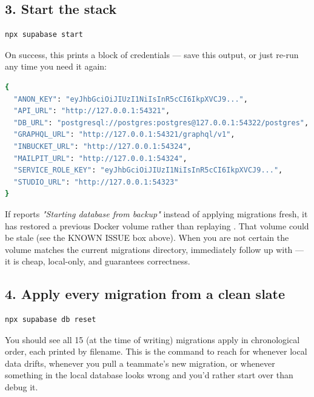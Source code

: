 \subsection{3. Start the stack}

\begin{lstlisting}[style=olkcodebash, language=bash, caption={Pulls Supabase's Docker images (first run only) and starts every service}]
npx supabase start
\end{lstlisting}

On success, this prints a block of credentials — save this output, or just re-run  any time you need it again:

\begin{lstlisting}[style=olkcodebash, language=bash, caption={Typical `supabase start` / `supabase status` output}]
{
  "ANON_KEY": "eyJhbGciOiJIUzI1NiIsInR5cCI6IkpXVCJ9...",
  "API_URL": "http://127.0.0.1:54321",
  "DB_URL": "postgresql://postgres:postgres@127.0.0.1:54322/postgres",
  "GRAPHQL_URL": "http://127.0.0.1:54321/graphql/v1",
  "INBUCKET_URL": "http://127.0.0.1:54324",
  "MAILPIT_URL": "http://127.0.0.1:54324",
  "SERVICE_ROLE_KEY": "eyJhbGciOiJIUzI1NiIsInR5cCI6IkpXVCJ9...",
  "STUDIO_URL": "http://127.0.0.1:54323"
}
\end{lstlisting}

\begin{olktip}
If  reports \emph{"Starting database from backup"} instead of applying migrations fresh, it has restored a previous Docker volume rather than replaying . That volume could be stale (see the KNOWN ISSUE box above). When you are not certain the volume matches the current migrations directory, immediately follow up with  — it is cheap, local-only, and guarantees correctness.
\end{olktip}

\subsection{4. Apply every migration from a clean slate}

\begin{lstlisting}[style=olkcodebash, language=bash, caption={Wipes the local database and replays every file in supabase/migrations in order}]
npx supabase db reset
\end{lstlisting}

You should see all 15 (at the time of writing) migrations apply in chronological order, each printed by filename. This is the command to reach for whenever local data drifts, whenever you pull a teammate's new migration, or whenever something in the local database looks wrong and you'd rather start over than debug it.

